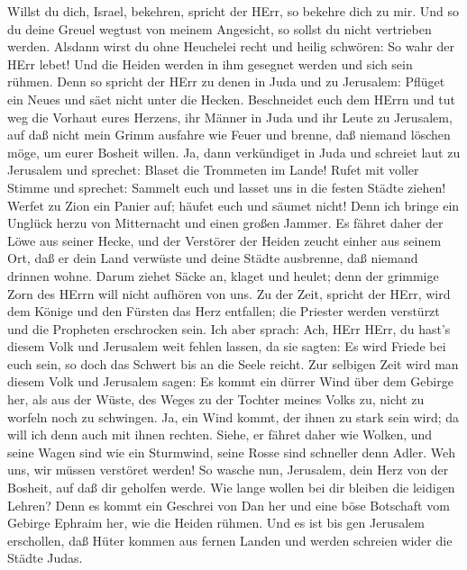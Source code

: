  Willst du dich, Israel, bekehren, spricht der HErr, so
bekehre dich zu mir. Und so du deine Greuel wegtust von meinem
Angesicht, so sollst du nicht vertrieben werden.  Alsdann
wirst du ohne Heuchelei recht und heilig schwören: So wahr der HErr
lebet! Und die Heiden werden in ihm gesegnet werden und sich sein
rühmen.  Denn so spricht der HErr zu denen in Juda und zu
Jerusalem: Pflüget ein Neues und säet nicht unter die Hecken.
 Beschneidet euch dem HErrn und tut weg die Vorhaut eures
Herzens, ihr Männer in Juda und ihr Leute zu Jerusalem, auf daß nicht
mein Grimm ausfahre wie Feuer und brenne, daß niemand löschen möge, um
eurer Bosheit willen.  Ja, dann verkündiget in Juda und
schreiet laut zu Jerusalem und sprechet: Blaset die Trommeten im Lande!
Rufet mit voller Stimme und sprechet: Sammelt euch und lasset uns in die
festen Städte ziehen!  Werfet zu Zion ein Panier auf; häufet
euch und säumet nicht! Denn ich bringe ein Unglück herzu von Mitternacht
und einen großen Jammer.  Es fähret daher der Löwe aus
seiner Hecke, und der Verstörer der Heiden zeucht einher aus seinem Ort,
daß er dein Land verwüste und deine Städte ausbrenne, daß niemand
drinnen wohne.  Darum ziehet Säcke an, klaget und heulet;
denn der grimmige Zorn des HErrn will nicht aufhören von uns.
 Zu der Zeit, spricht der HErr, wird dem Könige und den
Fürsten das Herz entfallen; die Priester werden verstürzt und die
Propheten erschrocken sein.  Ich aber sprach: Ach, HErr
HErr, du hast's diesem Volk und Jerusalem weit fehlen lassen, da sie
sagten: Es wird Friede bei euch sein, so doch das Schwert bis an die
Seele reicht.  Zur selbigen Zeit wird man diesem Volk und
Jerusalem sagen: Es kommt ein dürrer Wind über dem Gebirge her, als aus
der Wüste, des Weges zu der Tochter meines Volks zu, nicht zu worfeln
noch zu schwingen.  Ja, ein Wind kommt, der ihnen zu stark
sein wird; da will ich denn auch mit ihnen rechten.  Siehe,
er fähret daher wie Wolken, und seine Wagen sind wie ein Sturmwind,
seine Rosse sind schneller denn Adler. Weh uns, wir müssen verstöret
werden!  So wasche nun, Jerusalem, dein Herz von der
Bosheit, auf daß dir geholfen werde. Wie lange wollen bei dir bleiben
die leidigen Lehren?  Denn es kommt ein Geschrei von Dan
her und eine böse Botschaft vom Gebirge Ephraim her,  wie
die Heiden rühmen. Und es ist bis gen Jerusalem erschollen, daß Hüter
kommen aus fernen Landen und werden schreien wider die Städte Judas.
